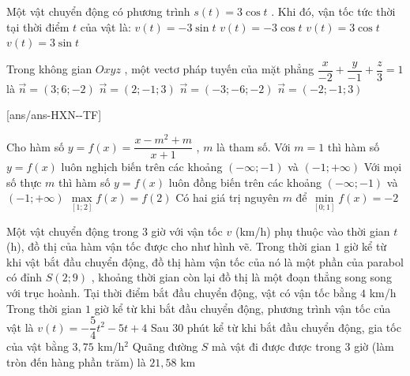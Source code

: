 \begin{ex}%
 Một vật chuyển động có phương trình $s(t)=3\cos t$ . Khi đó, vận tốc tức thời tại thời điểm $t$ của vật là:
 \choice
 {\True $v(t)=-3\sin t$}
 {$v(t)=-3\cos t$}
 {$v(t)=3\cos t$}
 {$v(t)=3\sin t$}
\end{ex}
\begin{ex}%
 Trong không gian $Oxyz$ , một vectơ pháp tuyến của mặt phẳng $\dfrac{x}{-2}+\dfrac{y}{-1}+\dfrac{z}{3}=1$ là
 \choice
 {\True $\vec{n}=(3;6;-2)$}
 {$\vec{n}=(2;-1;3)$}
 {$\vec{n}=(-3;-6;-2)$}
 {$\overrightarrow{n}=(-2;-1;3)$}
 \end{ex}
\cauds
{}[ans/ans-HXN-\sode-TF]
\begin{ex}%
 Cho hàm số $y=f(x)=\dfrac{x-m^2+m}{x+1}$ , $m$ là tham số.
 \choiceTF
 {Với $m=1$ thì hàm số $y=f(x)$ luôn nghịch biến trên các khoảng $\left(-\infty;-1\right)$ và $\left(-1;+\infty\right)$}
 {\True Với mọi số thực $m$ thì hàm số $y=f(x)$ luôn đồng biến trên các khoảng $\left(-\infty;-1\right)$ và $\left(-1;+\infty\right)$}
 {\True $\underset{\left[1;2\right]}{\max}f(x)=f(2)$}
 {\True Có hai giá trị nguyên $m$ để $\underset{\left[0;1\right]}{\min}f(x)=-2$}
\end{ex}
\begin{ex}%
\immini
{
    Một vật chuyển động trong $3$ giờ với vận tốc $v$ (km/h) phụ thuộc vào thời gian $t$ (h), đồ thị của hàm vận tốc được cho như hình vẽ. Trong thời gian $1$ giờ kể từ khi vật bắt đầu chuyển động, đồ thị hàm vận tốc của nó là một phần của parabol có đỉnh $S(2;9)$ , khoảng thời gian còn lại đồ thị là một đoạn thẳng song song với trục hoành.
 \choiceTF
 {\True Tại thời điểm bắt đầu chuyển động, vật có vận tốc bằng $4$ km/h}
 {Trong thời gian $1$ giờ kể từ khi bắt đầu chuyển động, phương trình vận tốc của vật là $v(t)=-\dfrac{5}{4}{t^2}-5t+4$}
 {\True Sau $30$ phút kể từ khi bắt đầu chuyển động, gia tốc của vật bằng $3,75$ km/h$^2$}
 {\True Quãng đường $S$ mà vật đi được được trong $3$ giờ (làm tròn đến hàng phần trăm) là $21{,}58$ km}
}
{
}
\end{ex}
